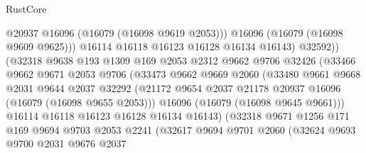 \begin{lexlean}{RustCore}
\begin{coremodule}
                                @20937
                                @16096
                                (@16079 (@16098 @9619 @2053)))
                              @16096
                              (@16079 (@16098 @9609 @9625)))
                            @16114
                            @16118
                            @16123
                            @16128
                            @16134
                            @16143)
                          @32592))
                      (@32318
                        @9638
                        @193
                        @1309
                        @169
                        @2053
                        @2312
                        @9662
                        @9706
                        @32426
                        (@33466
                          @9662
                          @9671
                          @2053
                          @9706
                          (@33473
                            @9662
                            @9669
                            @2060
                            (@33480
                              @9661
                              @9668
                              @2031
                              @9644
                              @2037
                              @32292
                              (@21172
                                @9654
                                @2037
                                @21178
                                @20937
                                @16096
                                (@16079 (@16098 @9655 @2053)))
                              @16096
                              (@16079 (@16098 @9645 @9661)))
                            @16114
                            @16118
                            @16123
                            @16128
                            @16134
                            @16143)
                          (@32318
                            @9671
                            @1256
                            @171
                            @169
                            @9694
                            @9703
                            @2053
                            @2241
                            (@32617
                              @9694
                              @9701
                              @2060
                              (@32624
                                @9693
                                @9700
                                @2031
                                @9676
                                @2037

\end{coremodule}
\end{lexlean}
